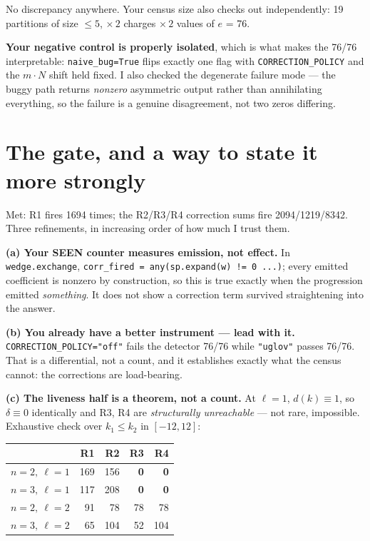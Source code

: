 \documentclass[11pt,a4paper]{article}
\begin{document}
No discrepancy anywhere. Your census size also checks out independently: 19
partitions of size $\le5$, $\times\,2$ charges $\times\,2$ values of $e$ = 76.

\textbf{Your negative control is properly isolated}, which is what makes the
76/76 interpretable: \texttt{naive\_bug=True} flips exactly one flag with
\texttt{CORRECTION\_POLICY} and the $m\!\cdot\!N$ shift held fixed. I also
checked the degenerate failure mode --- the buggy path returns \emph{nonzero}
asymmetric output rather than annihilating everything, so the failure is a
genuine disagreement, not two zeros differing.

\section{The gate, and a way to state it more strongly}

Met: R1 fires 1694 times; the R2/R3/R4 correction sums fire 2094/1219/8342.
Three refinements, in increasing order of how much I trust them.

\textbf{(a) Your SEEN counter measures emission, not effect.} In
\texttt{wedge.exchange}, \texttt{corr\_fired = any(sp.expand(w) != 0 ...)}; every
emitted coefficient is nonzero by construction, so this is true exactly when the
progression emitted \emph{something}. It does not show a correction term survived
straightening into the answer.

\textbf{(b) You already have a better instrument --- lead with it.}
\texttt{CORRECTION\_POLICY="off"} fails the detector 76/76 while
\texttt{"uglov"} passes 76/76. That is a differential, not a count, and it
establishes exactly what the census cannot: the corrections are load-bearing.

\textbf{(c) The liveness half is a theorem, not a count.} At $\ell=1$,
$d(k)\equiv1$, so $\delta\equiv0$ identically and R3, R4 are \emph{structurally
unreachable} --- not rare, impossible. Exhaustive check over $k_1\le k_2$ in
$[-12,12]$:

\begin{center}
\begin{tabular}{lrrrr}
\toprule
 & R1 & R2 & R3 & R4 \\
\midrule
$n=2,\ \ell=1$ & 169 & 156 & \textbf{0} & \textbf{0} \\
$n=3,\ \ell=1$ & 117 & 208 & \textbf{0} & \textbf{0} \\
$n=2,\ \ell=2$ & 91 & 78 & 78 & 78 \\
$n=3,\ \ell=2$ & 65 & 104 & 52 & 104 \\
\bottomrule
\end{tabular}
\end{center}
\end{document}
